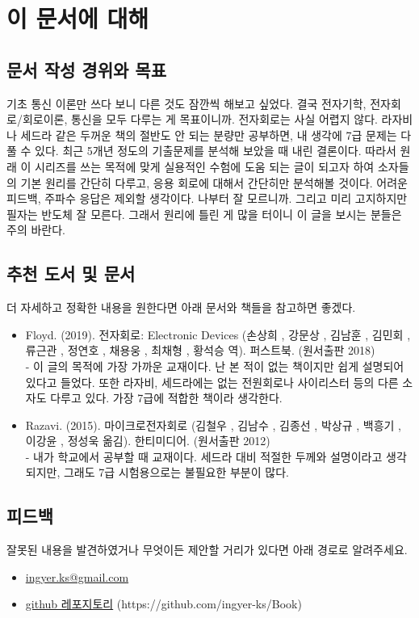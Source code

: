 \chapter{이 문서에 대해}

\section{문서 작성 경위와 목표}
기초 통신 이론만 쓰다 보니 다른 것도 잠깐씩 해보고 싶었다. 결국 전자기학, 전자회로/회로이론, 통신을 모두 다루는 게 목표이니까.
전자회로는 사실 어렵지 않다. 라자비나 세드라 같은 두꺼운 책의 절반도 안 되는 분량만 공부하면, 내 생각에 7급 문제는 다 풀 수 있다.
최근 5개년 정도의 기출문제를 분석해 보았을 때 내린 결론이다.
따라서 원래 이 시리즈를 쓰는 목적에 맞게 실용적인 수험에 도움 되는 글이 되고자 하여 소자들의 기본 원리를 간단히 다루고, 응용 회로에 대해서 간단히만 분석해볼 것이다.
어려운 피드백, 주파수 응답은 제외할 생각이다. 나부터 잘 모르니까.
그리고 미리 고지하지만 필자는 반도체 잘 모른다. 그래서 원리에 틀린 게 많을 터이니 이 글을 보시는 분들은 주의 바란다.

\section{추천 도서 및 문서}
더 자세하고 정확한 내용을 원한다면 아래 문서와 책들을 참고하면 좋겠다.
\begin{itemize}
    \item Floyd. (2019). 전자회로: Electronic Devices (손상희 , 강문상 , 김남훈 , 김민회 , 류근관 , 정연호 , 채용웅 , 최채형 , 황석승 역). 퍼스트북. (원서출판 2018) \\
    - 이 글의 목적에 가장 가까운 교재이다. 난 본 적이 없는 책이지만 쉽게 설명되어 있다고 들었다. 또한 라자비, 세드라에는 없는 전원회로나 사이리스터 등의 다른 소자도 다루고 있다. 가장 7급에 적합한 책이라 생각한다.
    \item Razavi. (2015). 마이크로전자회로 (김철우 , 김남수 , 김종선 , 박상규 , 백흥기 , 이강윤 , 정성욱 옮김). 한티미디어. (원서출판 2012)\\
    - 내가 학교에서 공부할 때 교재이다. 세드라 대비 적절한 두께와 설명이라고 생각되지만, 그래도 7급 시험용으로는 불필요한 부분이 많다.
\end{itemize}

\section{피드백}
잘못된 내용을 발견하였거나 무엇이든 제안할 거리가 있다면 아래 경로로 알려주세요.
\begin{itemize}
    \item \href{mailto:ingyer.ks@gmail.com}{ingyer.ks@gmail.com}
    \item \href{https://github.com/ingyer-ks/Book}{github 레포지토리} (https://github.com/ingyer-ks/Book)
\end{itemize}
